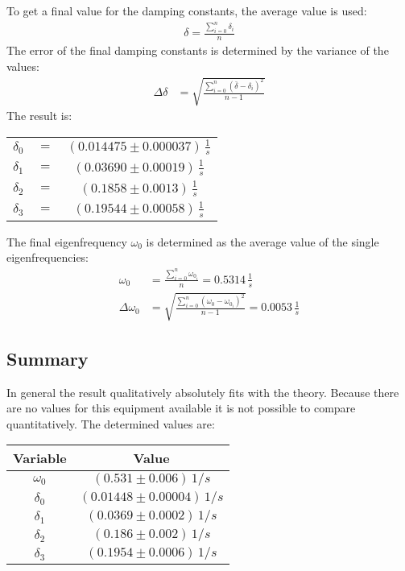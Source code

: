 To get a final value for the damping constants, the average value is used:
\begin{align}
\delta = \frac{\sum_{i=0}^n \delta_i}{n}
\end{align}
The error of the final damping constants is determined by the variance of the values:
\begin{align}
\Delta\delta &= \sqrt{\frac{\sum_{i=0}^n \left( \bar{\delta} -\delta_i\right)^2 }{n-1}}
\end{align}
The result is:
\begin{center}
\begin{tabular}{ccc}
\(\delta_0\) & \(=\) &\(\left(0.014475 \pm 0.000037 \right)\, \frac{1}{s}\)\\
\(\delta_1\) & \(=\) &\(\left(0.03690 \pm 0.00019 \right)\, \frac{1}{s}\)\\
\(\delta_2\) & \(=\) &\(\left(0.1858 \pm 0.0013 \right)\, \frac{1}{s}\)\\
\(\delta_3\) & \(=\) &\(\left(0.19544 \pm 0.00058 \right)\, \frac{1}{s}\)
\end{tabular}
\end{center}
The final eigenfrequency \(\omega_0\) is determined as the average value of the single eigenfrequencies:
\begin{align}
\omega_0 &= \frac{\sum_{i=0}^n \omega_{0_i}}{n} = 0.5314 \, \frac{1}{s}\\
\Delta \omega_0 &= \sqrt{\frac{\sum_{i=0}^n \left( \omega_0 -\omega_{0_i}\right)^2 }{n-1}} = 0.0053\, \frac{1}{s}
\end{align}
\subsection{Summary}
In general the result qualitatively absolutely fits with the theory. Because there are no values for this equipment available it 
is not possible to compare quantitatively. The determined values are:
\begin{center}
\begin{tabular}{c|c}
Variable & Value \\\hline
\(\omega_0\) & \(\left(0.531 \pm 0.006 \right)\, 1/s\) \\
\(\delta_0\) &\(\left(0.01448 \pm 0.00004 \right)\, 1/s\)\\
\(\delta_1\) &\(\left(0.0369 \pm 0.0002 \right)\, 1/s\)\\
\(\delta_2\) &\(\left(0.186 \pm 0.002 \right)\, 1/s\)\\
\(\delta_3\) &\(\left(0.1954 \pm 0.0006 \right)\, 1/s\)
\end{tabular}
\end{center}